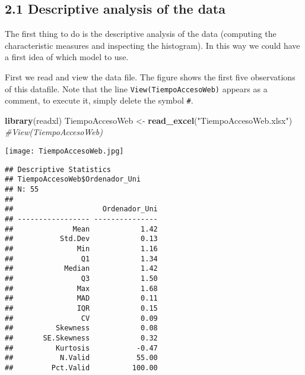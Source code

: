 \documentclass[
]{article}
\newenvironment{Shaded}{\begin{snugshade}}{\end{snugshade}}
\newcommand{\CommentTok}[1]{\textcolor[rgb]{0.56,0.35,0.01}{\textit{#1}}}
\newcommand{\FunctionTok}[1]{\textcolor[rgb]{0.13,0.29,0.53}{\textbf{#1}}}
\newcommand{\NormalTok}[1]{#1}
\newcommand{\OtherTok}[1]{\textcolor[rgb]{0.56,0.35,0.01}{#1}}
\newcommand{\SpecialCharTok}[1]{\textcolor[rgb]{0.81,0.36,0.00}{\textbf{#1}}}
\newcommand{\StringTok}[1]{\textcolor[rgb]{0.31,0.60,0.02}{#1}}
\begin{document}
\hypertarget{descriptive-analysis-of-the-data}{%
\subsection{2.1 Descriptive analysis of the
data}\label{descriptive-analysis-of-the-data}}

The first thing to do is the descriptive analysis of the data (computing
the characteristic measures and inspecting the histogram). In this way
we could have a first idea of which model to use.

First we read and view the data file. The figure shows the first five
observations of this datafile. Note that the line
\texttt{View(TiempoAccesoWeb)} appears as a comment, to execute it,
simply delete the symbol \texttt{\#}.

\begin{Shaded}
\begin{Highlighting}[]
\FunctionTok{library}\NormalTok{(readxl)}
\NormalTok{TiempoAccesoWeb }\OtherTok{\textless{}{-}} \FunctionTok{read\_excel}\NormalTok{(}\StringTok{"TiempoAccesoWeb.xlsx"}\NormalTok{)}
\CommentTok{\#View(TiempoAccesoWeb)}
\end{Highlighting}
\end{Shaded}

\texttt{[image: TiempoAccesoWeb.jpg]}

\begin{Shaded}
\end{Shaded}

\begin{verbatim}
## Descriptive Statistics  
## TiempoAccesoWeb$Ordenador_Uni  
## N: 55  
## 
##                     Ordenador_Uni
## ----------------- ---------------
##              Mean            1.42
##           Std.Dev            0.13
##               Min            1.16
##                Q1            1.34
##            Median            1.42
##                Q3            1.50
##               Max            1.68
##               MAD            0.11
##               IQR            0.15
##                CV            0.09
##          Skewness            0.08
##       SE.Skewness            0.32
##          Kurtosis           -0.47
##           N.Valid           55.00
##         Pct.Valid          100.00
\end{verbatim}
\end{document}
